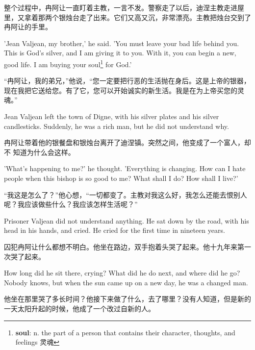 \documentclass[fontset=ubuntu, zihao=5]{ctexart}
\begin{document}
\begin{paracol}{2}
  \switchcolumn
  整个过程中，冉阿让一直盯着主教，一言不发。警察走了以后，迪涅主教走进屋里，又拿着那两个银烛台走了出来。它们又高又沉，非常漂亮。主教把烛台交到了冉阿让的手里。

  \switchcolumn*

  'Jean Valjean, my brother,' he said. 'You must leave your bad life behind you. This is God's silver, and I am giving it to you. With it, you can begin a new, good life. I am buying your soul\footnote{\textbf{soul}: n. the part of a person that contains their character, thoughts, and feelings 灵魂} for God.'

  \switchcolumn
  “冉阿让，我的弟兄，”他说，“您一定要把行恶的生活抛在身后。这是上帝的银器，现在我把它送给您。有了它，您可以开始诚实的新生活。我是在为上帝买您的灵魂。”

  \switchcolumn*

  \sectionbreak

  Jean Valjean left the town of Digne, with his silver plates and his silver candlesticks. Suddenly, he was a rich man, but he did not understand why.

  \switchcolumn

  \sectionbreak

  冉阿让带着他的银餐盘和银烛台离开了迪涅镇。突然之间，他变成了一个富人，却不
  知道为什么会这样。

  \switchcolumn*

  'What's happening to me?' he thought. 'Everything is changing. How can I hate people when this bishop is so good to me? What shall I do? How shall I live?'

  \switchcolumn
  “我这是怎么了？”他心想，“一切都变了。主教对我这么好，我怎么还能去恨别人呢？我应该做些什么？我应该怎样生活呢？”

  \switchcolumn*

  Prisoner Valjean did not understand anything. He sat down by the road, with his head in his hands, and cried. He cried for the first time in nineteen years.

  \switchcolumn

  囚犯冉阿让什么都想不明白。他坐在路边，双手抱着头哭了起来。他十九年来第一次哭了起来。

  \switchcolumn*

  How long did he sit there, crying? What did he do next, and where did he go? Nobody knows, but when the sun came up on a new day, he was a changed man.

  \switchcolumn

  他坐在那里哭了多长时间？他接下来做了什么，去了哪里？没有人知道，但是新的一天太阳升起的时候，他成了一个改过自新的人。



\end{paracol}
\end{document}
